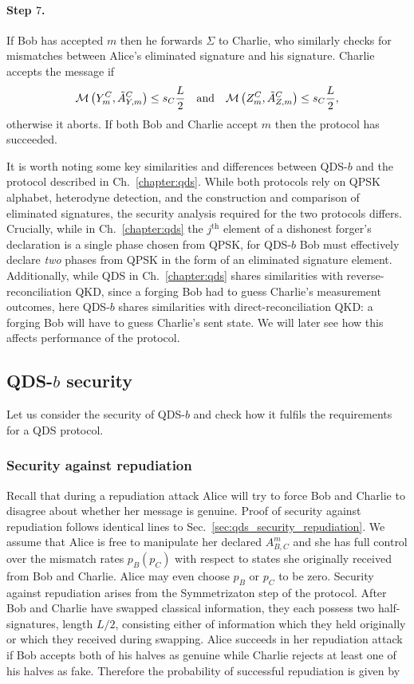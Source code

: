 \paragraph{Step $7$.} If Bob has accepted $m$ then he forwards $\Sigma$ to Charlie, who similarly checks for mismatches between Alice's eliminated signature and his signature. Charlie accepts the message if
\begin{equation}
\mathcal{M}\left(Y_m^C, \tilde{A}_{Y, m}^C\right) \le s_C \frac{L}{2} \qq{and} \mathcal{M}\left(Z_m^C, \tilde{A}_{Z, m}^C\right) \le s_C \frac{L}{2},
\end{equation}
otherwise it aborts. %
If both Bob and Charlie accept $m$ then the protocol has succeeded. 

It is worth noting some key similarities and differences between QDS-$b$ and the protocol described in Ch.~\ref{chapter:qds}. While both protocols rely on QPSK alphabet, heterodyne detection, and the construction and comparison of eliminated signatures, the security analysis required for the two protocols differs. Crucially, while in Ch.~\ref{chapter:qds} the $j^{\text{th}}$ element of a dishonest forger's declaration is a single phase chosen from QPSK, for QDS-$b$ Bob must effectively declare \emph{two} phases from QPSK in the form of an eliminated signature element. Additionally, while QDS in Ch.~\ref{chapter:qds} shares similarities with reverse-reconciliation QKD, since a forging Bob had to guess Charlie's measurement outcomes, here QDS-$b$ shares similarities with direct-reconciliation QKD: a forging Bob will have to guess Charlie's sent state. We will later see how this affects performance of the protocol. 

\subsection{QDS-$b$ security}
Let us consider the security of QDS-$b$ and check how it fulfils the requirements for a QDS protocol. 

\subsubsection{Security against repudiation}
Recall that during a repudiation attack Alice will try to force Bob and Charlie to disagree about whether her message is genuine. Proof of security against repudiation follows identical lines to Sec.~\ref{sec:qds_security_repudiation}. We assume that Alice is free to manipulate her declared $A_{B, C}^m$ and she has full control over the mismatch rates $p_B \left(p_C\right)$ with respect to states she originally received from Bob and Charlie. Alice may even choose $p_B$ or $p_C$ to be zero. Security against repudiation arises from the Symmetrizaton step of the protocol. After Bob and Charlie have swapped classical information, they each possess two half-signatures, length $L/2$, consisting either of information which they held originally or which they received during swapping. Alice succeeds in her repudiation attack if Bob accepts both of his halves as genuine while Charlie rejects at least one of his halves as fake. Therefore the probability of successful repudiation is given by


